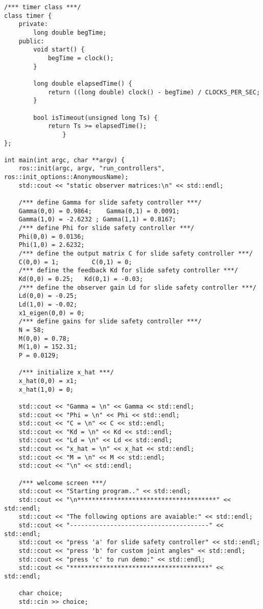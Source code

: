 \begin{lstlisting}[language=gedit]
/*** timer class ***/
class timer {
	private:
		long double begTime;
	public:
		void start() {
			begTime = clock();
		}

		long double elapsedTime() {
			return ((long double) clock() - begTime) / CLOCKS_PER_SEC;
		}

		bool isTimeout(unsigned long Ts) {
			return Ts >= elapsedTime();
        		}
};

int main(int argc, char **argv) {
    ros::init(argc, argv, "run_controllers", ros::init_options::AnonymousName);
    std::cout << "static observer matrices:\n" << std::endl;

    /*** define Gamma for slide safety controller ***/
    Gamma(0,0) = 0.9864;    Gamma(0,1) = 0.0091;
    Gamma(1,0) = -2.6232 ; Gamma(1,1) = 0.8167;
    /*** define Phi for slide safety controller ***/
    Phi(0,0) = 0.0136;      
    Phi(1,0) = 2.6232;
    /*** define the output matrix C for slide safety controller ***/
    C(0,0) = 1;         C(0,1) = 0;
    /*** define the feedback Kd for slide safety controller ***/
    Kd(0,0) = 0.25;   Kd(0,1) = -0.03;
    /*** define the observer gain Ld for slide safety controller ***/
    Ld(0,0) = -0.25;
    Ld(1,0) = -0.02;
    x1_eigen(0,0) = 0;
    /*** define gains for slide safety controller ***/
    N = 58;
    M(0,0) = 0.78;
    M(1,0) = 152.31;
    P = 0.0129;

    /*** initialize x_hat ***/
    x_hat(0,0) = x1;
    x_hat(1,0) = 0;

    std::cout << "Gamma = \n" << Gamma << std::endl;
    std::cout << "Phi = \n" << Phi << std::endl;
    std::cout << "C = \n" << C << std::endl;
    std::cout << "Kd = \n" << Kd << std::endl;
    std::cout << "Ld = \n" << Ld << std::endl;
    std::cout << "x_hat = \n" << x_hat << std::endl;
    std::cout << "M = \n" << M << std::endl;
    std::cout << "\n" << std::endl;

    /*** welcome screen ***/
    std::cout << "Starting program.." << std::endl;
    std::cout << "\n**************************************" << std::endl;
    std::cout << "The following options are avaiable:" << std::endl;
    std::cout << "--------------------------------------" << std::endl;
    std::cout << "press 'a' for slide safety controller" << std::endl;
    std::cout << "press 'b' for custom joint angles" << std::endl;
    std::cout << "press 'c' to run demo:" << std::endl;
    std::cout << "**************************************" << std::endl;
    
    char choice;
    std::cin >> choice;


\end{lstlisting}
